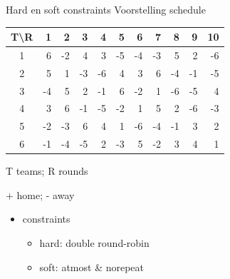 \documentclass{beamer}
\begin{document}
 \begin{frame}{Hard en soft constraints}
Voorstelling schedule

 \begin{center} \scriptsize
 \begin{tabular}{c | *{10}{r} }
  \textbf{T\textbackslash{}R} & 1 & 2 &3 & 4 & 5 & 6 & 7 & 8 & 9 & 10 \\ \hline
 1 &     6&-2&4&3&-5&-4&-3&5&2&-6 \\
 2 &    5&1&-3&-6&4&3&6&-4&-1&-5\\
 3 &    -4&5&2&-1&6&-2&1&-6&-5&4\\
 4 &    3&6&-1&-5&-2&1&5&2&-6&-3\\
 5&    -2&-3&6&4&1&-6&-4&-1&3&2\\
 6 &  -1&-4&-5&2&-3&5&-2&3&4&1 \\
 \end{tabular}
 \end{center}

\begin{itemize}
\scriptsize{
 \item T teams; R rounds
\item + home; - away }
\end{itemize}


\begin{itemize}
 \item constraints
\begin{itemize}
 \item hard: double round-robin
 \item soft: atmost \& norepeat
\end{itemize}
\end{itemize}



\end{frame}
\end{document}
